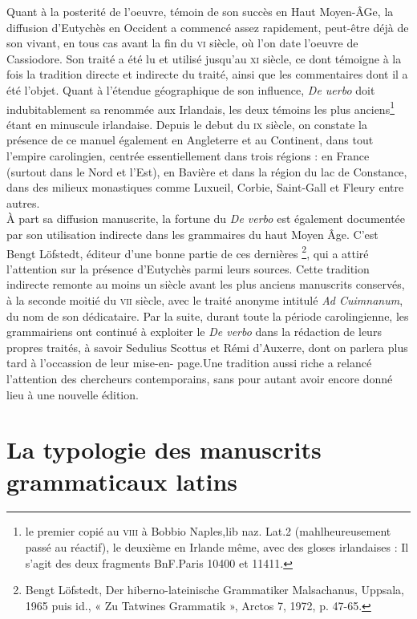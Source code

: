 \documentclass[a4paper, twoside, 12pt]{book}
\begin{document}
Quant à la posterité de l'oeuvre, témoin de son succès en Haut Moyen-ÂGe, la diffusion d’Eutychès en Occident a commencé assez rapidement, peut-être déjà de son vivant, en tous cas avant la fin du \textsc{vi}\ieme{} siècle, où l'on date l'oeuvre de Cassiodore. Son traité a été lu et utilisé jusqu’au \textsc{xi}\ieme{} siècle, ce dont témoigne à la fois la tradition directe et indirecte du traité, ainsi que les commentaires dont il a été l’objet. Quant à l'étendue géographique de son influence, \textit{De uerbo} doit indubitablement sa renommée aux Irlandais, les deux témoins les plus anciens\footnote{le  premier  copié  au \textsc{viii}\ieme{} à  Bobbio  Naples,lib naz. Lat.2 (mahlheureusement passé au réactif),  le  deuxième  en  Irlande même,  avec  des gloses  irlandaises : Il s'agit des deux fragments BnF.Paris 10400  et 11411.} étant en minuscule irlandaise. Depuis le debut du \textsc{ix}\ieme{} siècle, on  constate la présence de ce manuel également en Angleterre et au Continent, dans tout l'empire carolingien, centrée essentiellement dans trois régions : en France (surtout dans le Nord et l'Est), en Bavière et dans la région  du lac de Constance, dans des milieux monastiques comme Luxueil, Corbie, Saint-Gall et Fleury entre autres.\\

À part sa diffusion manuscrite, la fortune du \textit{De verbo} est également documentée par son utilisation indirecte dans les grammaires du haut Moyen Âge. C’est Bengt Löfstedt, éditeur d’une bonne partie de ces dernières \footnote{Bengt Löfstedt, Der hiberno-lateinische Grammatiker Malsachanus, Uppsala, 1965 puis id., « Zu Tatwines Grammatik », Arctos 7, 1972, p. 47-65.}, qui a attiré l’attention sur la présence d’Eutychès parmi leurs sources. Cette tradition indirecte remonte au moins un siècle avant les plus anciens manuscrits conservés, à la seconde moitié du  \textsc{vii}\ieme{} siècle, avec le traité anonyme intitulé \textit{Ad Cuimnanum}, du nom de son dédicataire. Par la suite, durant toute la période carolingienne, les grammairiens ont continué à exploiter le \textit{De verbo} dans la rédaction de leurs propres traités, à savoir Sedulius Scottus et Rémi d'Auxerre, dont on parlera plus tard à l'occassion de leur mise-en- page.Une tradition aussi riche a relancé l'attention des chercheurs contemporains, sans pour autant avoir encore donné lieu à une nouvelle édition.

\section{La typologie des manuscrits grammaticaux latins}
\end{document}
